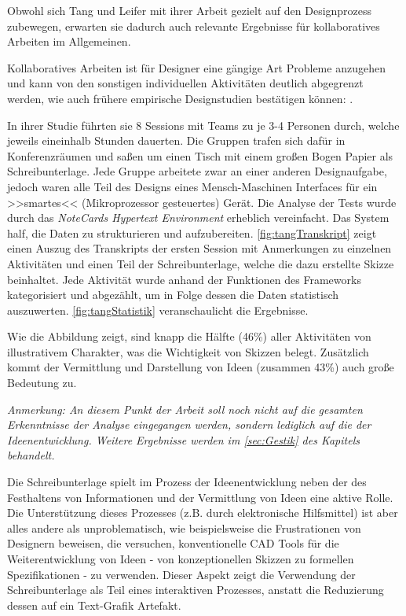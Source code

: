\medskip Obwohl sich Tang und Leifer mit ihrer Arbeit gezielt auf den Designprozess zubewegen, erwarten sie dadurch auch relevante Ergebnisse für kollaboratives Arbeiten im Allgemeinen. \par Kollaboratives Arbeiten ist für Designer eine gängige Art Probleme anzugehen und kann von den sonstigen individuellen Aktivitäten deutlich abgegrenzt werden, wie auch frühere empirische Designstudien bestätigen können: \citep{Akin:1978, Lera:1983, Ullman:1987, Ballay:1987}.

\medskip In ihrer Studie führten sie 8 Sessions mit Teams zu je 3-4 Personen durch, welche jeweils eineinhalb Stunden dauerten. Die Gruppen trafen sich dafür in Konferenzräumen und saßen um einen Tisch mit einem großen Bogen Papier als Schreibunterlage. Jede Gruppe arbeitete zwar an einer anderen Designaufgabe, jedoch waren alle Teil des Designs eines Mensch-Maschinen Interfaces für ein >>smartes<< (Mikroprozessor gesteuertes) Gerät.
Die Analyse der Tests wurde durch das \emph{NoteCards Hypertext Environment} \citep{Halasz:1986:NN:29933.30859} erheblich vereinfacht. Das System half, die Daten zu strukturieren und aufzubereiten. \autoref{fig:tangTranskript} zeigt einen Auszug des Transkripts der ersten Session mit Anmerkungen zu einzelnen Aktivitäten und einen Teil der Schreibunterlage, welche die dazu erstellte Skizze beinhaltet. Jede Aktivität wurde anhand der Funktionen des Frameworks kategorisiert und abgezählt, um in Folge dessen die Daten statistisch auszuwerten. \autoref{fig:tangStatistik} veranschaulicht die Ergebnisse.

\medskip Wie die Abbildung zeigt, sind knapp die Hälfte (46\%) aller Aktivitäten von illustrativem Charakter, was die Wichtigkeit von Skizzen belegt. Zusätzlich kommt der Vermittlung und Darstellung von Ideen (zusammen 43\%) auch große Bedeutung zu.\par
\medskip \emph{Anmerkung: \graffito{\(\clubsuit\)} An diesem Punkt der Arbeit soll noch nicht auf die gesamten Erkenntnisse der Analyse eingegangen werden, sondern lediglich auf die der Ideenentwicklung. Weitere Ergebnisse werden im \autoref{sec:Gestik} des Kapitels  behandelt.}

\medskip Die Schreibunterlage spielt im Prozess der Ideenentwicklung neben der des Festhaltens von Informationen und der Vermittlung von Ideen eine aktive Rolle. Die Unterstützung dieses Prozesses (z.B. durch elektronische Hilfsmittel) ist aber alles andere als unproblematisch, wie beispielsweise die Frustrationen von Designern beweisen, die versuchen, konventionelle \ac{CAD} Tools für die Weiterentwicklung von Ideen - von konzeptionellen Skizzen zu formellen Spezifikationen - zu verwenden. Dieser Aspekt zeigt die Verwendung der Schreibunterlage als Teil eines interaktiven Prozesses, anstatt die Reduzierung dessen auf ein Text-Grafik Artefakt. 

